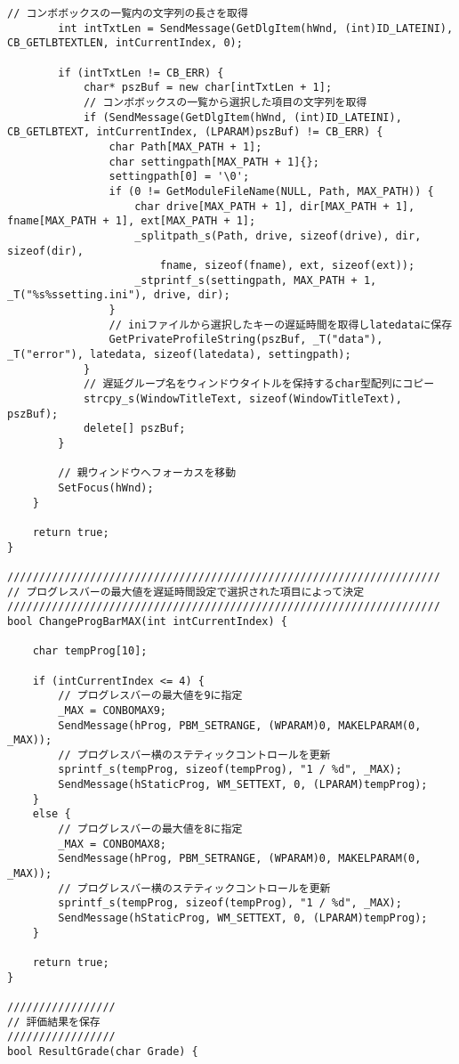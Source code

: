 \begin{lstlisting}[caption=main.cpp]
		// コンボボックスの一覧内の文字列の長さを取得
		int intTxtLen = SendMessage(GetDlgItem(hWnd, (int)ID_LATEINI), CB_GETLBTEXTLEN, intCurrentIndex, 0);

		if (intTxtLen != CB_ERR) {
			char* pszBuf = new char[intTxtLen + 1];
			// コンボボックスの一覧から選択した項目の文字列を取得
			if (SendMessage(GetDlgItem(hWnd, (int)ID_LATEINI), CB_GETLBTEXT, intCurrentIndex, (LPARAM)pszBuf) != CB_ERR) {
				char Path[MAX_PATH + 1];
				char settingpath[MAX_PATH + 1]{};
				settingpath[0] = '\0';
				if (0 != GetModuleFileName(NULL, Path, MAX_PATH)) {
					char drive[MAX_PATH + 1], dir[MAX_PATH + 1], fname[MAX_PATH + 1], ext[MAX_PATH + 1];
					_splitpath_s(Path, drive, sizeof(drive), dir, sizeof(dir),
						fname, sizeof(fname), ext, sizeof(ext));
					_stprintf_s(settingpath, MAX_PATH + 1, _T("%s%ssetting.ini"), drive, dir);
				}
				// iniファイルから選択したキーの遅延時間を取得しlatedataに保存
				GetPrivateProfileString(pszBuf, _T("data"), _T("error"), latedata, sizeof(latedata), settingpath);
			}
			// 遅延グループ名をウィンドウタイトルを保持するchar型配列にコピー
			strcpy_s(WindowTitleText, sizeof(WindowTitleText), pszBuf);
			delete[] pszBuf;
		}

		// 親ウィンドウへフォーカスを移動
		SetFocus(hWnd);
	}
	
	return true;
}

////////////////////////////////////////////////////////////////////
// プログレスバーの最大値を遅延時間設定で選択された項目によって決定
////////////////////////////////////////////////////////////////////
bool ChangeProgBarMAX(int intCurrentIndex) {

	char tempProg[10];

	if (intCurrentIndex <= 4) {
		// プログレスバーの最大値を9に指定
		_MAX = CONBOMAX9;
		SendMessage(hProg, PBM_SETRANGE, (WPARAM)0, MAKELPARAM(0, _MAX));
		// プログレスバー横のステティックコントロールを更新
		sprintf_s(tempProg, sizeof(tempProg), "1 / %d", _MAX);
		SendMessage(hStaticProg, WM_SETTEXT, 0, (LPARAM)tempProg);
	}
	else {
		// プログレスバーの最大値を8に指定
		_MAX = CONBOMAX8;
		SendMessage(hProg, PBM_SETRANGE, (WPARAM)0, MAKELPARAM(0, _MAX));
		// プログレスバー横のステティックコントロールを更新
		sprintf_s(tempProg, sizeof(tempProg), "1 / %d", _MAX);
		SendMessage(hStaticProg, WM_SETTEXT, 0, (LPARAM)tempProg);
	}

	return true;
}

/////////////////
// 評価結果を保存
/////////////////
bool ResultGrade(char Grade) {


\end{lstlisting}
